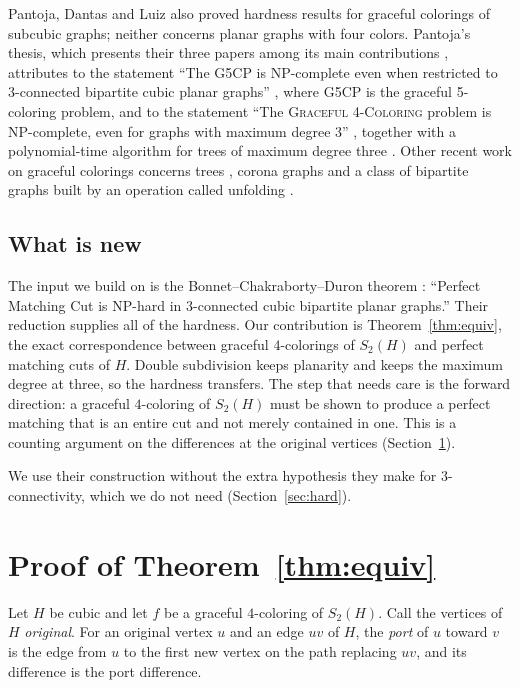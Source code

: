 \documentclass[11pt]{article}
\theoremstyle{remark}
\begin{document}
Pantoja, Dantas and Luiz also proved hardness results for graceful colorings
of subcubic graphs; neither concerns planar graphs with four colors. Pantoja's
thesis, which presents their three papers \cite{PDL371,PDL374,PDL381} among
its main contributions \cite{Pantoja}, attributes to \cite{PDL374} the
statement ``The G5CP is NP-complete even when restricted to 3-connected
bipartite cubic planar graphs'' \cite[Theorem~10]{Pantoja}, where G5CP is the
graceful 5-coloring problem, and to \cite{PDL381} the statement ``The
\textup{\textsc{Graceful 4-Coloring}} problem is NP-complete, even for graphs
with maximum degree 3'' \cite[Theorem~34]{Pantoja}, together with a
polynomial-time algorithm for trees of maximum degree three
\cite[Theorem~33]{Pantoja}. Other recent work on graceful colorings concerns
trees \cite{BNS,Popa}, corona graphs \cite{LDcorona} and a class of bipartite
graphs built by an operation called unfolding \cite{LDN}.

\subsection{What is new}

The input we build on is the Bonnet--Chakraborty--Duron theorem
\cite[Theorem~1]{BCD}: ``Perfect Matching Cut is NP-hard in 3-connected cubic
bipartite planar graphs.'' Their reduction supplies all of the hardness. Our contribution
is Theorem~\ref{thm:equiv}, the exact correspondence between graceful
$4$-colorings of $S_2(H)$ and perfect matching cuts of $H$. Double subdivision
keeps planarity and keeps the maximum degree at three, so the hardness transfers. The step that needs care is the forward direction: a graceful
$4$-coloring of $S_2(H)$ must be shown to produce a perfect matching that is
an entire cut and not merely contained in one. This is a counting argument on
the differences at the original vertices (Section~\ref{sec:equiv}).

We use their construction without the extra hypothesis they make for
$3$-connectivity, which we do not need (Section~\ref{sec:hard}).

\section{Proof of Theorem~\ref{thm:equiv}}\label{sec:equiv}

Let $H$ be cubic and let $f$ be a graceful $4$-coloring of $S_2(H)$. Call the
vertices of $H$ \emph{original}. For an original vertex $u$ and an edge $uv$
of $H$, the \emph{port} of $u$ toward $v$ is the edge from $u$ to the first new
vertex on the path replacing $uv$, and its difference is the port difference.
\end{document}
